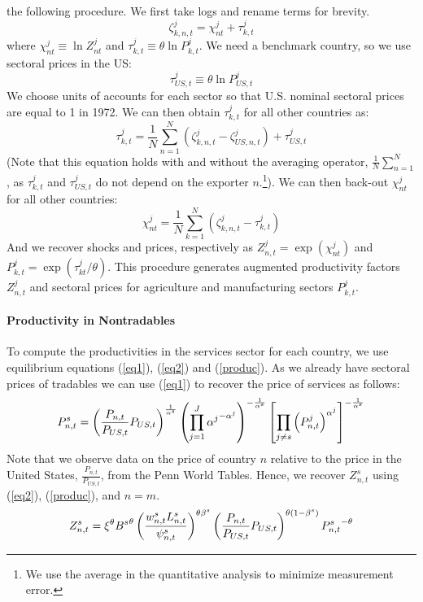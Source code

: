\documentclass[12pt]{article}
\begin{document}
the following procedure. We first take logs and rename terms for brevity. 
\begin{equation}
\zeta _{k,n,t}^{j}= \chi _{nt}^{j}+\tau _{k,t}^{j}
\end{equation}%
where $\chi _{nt}^{j}\equiv \ln {Z_{nt}^{j}}$ and $\tau _{k,t}^{j}\equiv
\theta \ln {P_{k,t}^{j}}$. We need a benchmark country, so we use sectoral
prices in the US: 
\begin{equation*}
\tau _{US,t}^{j}\equiv \theta \ln {P_{US,t}^{j}}
\end{equation*}%
We choose units of accounts for each sector so that U.S. nominal sectoral
prices are equal to 1 in 1972. We can then obtain $\tau _{k,t}^{j}$ for all
other countries as: 
\begin{equation}
\tau _{k,t}^{j}=\frac{1}{N}\sum_{n=1}^{N}\left( \zeta _{k,n,t}^{j}-\zeta
_{US,n,t}^{j}\right) +\tau _{US,t}^{j}
\end{equation}%
(Note that this equation holds with and without the averaging operator, $%
\frac{1}{N}\sum_{n=1}^{N}$, as $\tau _{k,t}^{j}$ and $\tau _{US,t}^{j}$ do
not depend on the exporter $n$.\footnote{%
We use the average in the quantitative analysis to minimize measurement
error.}). We can then back-out $\chi _{nt}^{j}$ for all other countries:%
\begin{equation}
\chi _{nt}^{j}=\frac{1}{N}\sum_{k=1}^{N}\left( \zeta _{k,n,t}^{j}-\tau
_{k,t}^{j}\right)
\end{equation}%
And we recover shocks and prices, respectively as $Z_{n,t}^{j}=\exp \left(
\chi _{nt}^{j}\right) $ and $P_{k,t}^{j}=\exp \left( \tau _{kt}^{j}/\theta
\right) .$ This procedure generates augmented productivity factors $%
Z_{n,t}^{j}$ and sectoral prices for agriculture and manufacturing sectors $%
P_{k,t}^{j}$.

\paragraph{Productivity in Nontradables}

To compute the productivities in the services sector for each country, we
use equilibrium equations (\ref{eq1}), (\ref{eq2}) and (\ref{produc}). As we
already have sectoral prices of tradables we can use (\ref{eq1}) to recover
the price of services as follows: 
\begin{equation}
P_{n,t}^{s}=\left( \frac{P_{n,t}}{P_{US,t}}P_{US,t}\right) ^{\frac{1}{\alpha
^{s}}}\left( \prod_{j=1}^{J}{\alpha ^{j}}^{-\alpha ^{j}}\right) ^{-\frac{1}{%
\alpha ^{s}}}\left[ \prod_{j\neq s}\left( P_{n,t}^{j}\right) ^{\alpha ^{j}}%
\right] ^{-\frac{1}{\alpha ^{s}}}
\end{equation}%
Note that we observe data on the price of country $n$ relative to the price
in the United States, $\frac{P_{n,t}}{P_{US,t}}$, from the Penn World
Tables. Hence, we recover $Z_{n,t}^{s}$ using (\ref{eq2}), (\ref{produc}),
and $n=m$. 
\begin{equation}
Z_{n,t}^{s}=\xi ^{\theta }{B^{s}}^{\theta }\left( \frac{%
w_{n,t}^{s}L_{n,t}^{s}}{\psi _{n,t}^{s}}\right) ^{\theta \beta ^{s}}\left( 
\frac{P_{n,t}}{P_{US,t}}P_{US,t}\right) ^{\theta (1-\beta ^{s})}{P_{n,t}^{s}}%
^{-\theta }
\end{equation}
\end{document}
